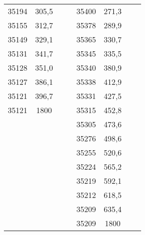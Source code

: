 \documentclass[11pt]{article}
\begin{document}
{{\begin{tabular}{|c|c|c|c|c|c|c|c|}
            \cline{1-2} \cline{5-6} 
            35194 & 305,5 & \multicolumn{1}{c}{} &  & 35400 & 271,3 &  & \tabularnewline
            \cline{1-2} \cline{5-6} 
            35155 & 312,7 & \multicolumn{1}{c}{} &  & 35378 & 289,9 &  & \tabularnewline
            \cline{1-2} \cline{5-6} 
            35149 & 329,1 & \multicolumn{1}{c}{} &  & 35365 & 330,7 &  & \tabularnewline
            \cline{1-2} \cline{5-6} 
            35131 & 341,7 & \multicolumn{1}{c}{} &  & 35345 & 335,5 &  & \tabularnewline
            \cline{1-2} \cline{5-6} 
            35128 & 351,0 & \multicolumn{1}{c}{} &  & 35340 & 380,9 &  & \tabularnewline
            \cline{1-2} \cline{5-6} 
            35127 & 386,1 & \multicolumn{1}{c}{} &  & 35338 & 412,9 &  & \tabularnewline
            \cline{1-2} \cline{5-6} 
            35121 & 396,7 & \multicolumn{1}{c}{} &  & 35331 & 427,5 &  & \tabularnewline
            \cline{1-2} \cline{5-6} 
            35121 & 1800 & \multicolumn{1}{c}{} &  & 35315 & 452,8 &  & \tabularnewline
            \cline{1-2} \cline{5-6} 
            \multicolumn{1}{c}{} & \multicolumn{1}{c}{} & \multicolumn{1}{c}{} &  & 35305 & 473,6 &  & \tabularnewline
            \cline{5-6} 
            \multicolumn{1}{c}{} & \multicolumn{1}{c}{} & \multicolumn{1}{c}{} &  & 35276 & 498,6 &  & \tabularnewline
            \cline{5-6} 
            \multicolumn{1}{c}{} & \multicolumn{1}{c}{} & \multicolumn{1}{c}{} &  & 35255 & 520,6 &  & \tabularnewline
            \cline{5-6} 
            \multicolumn{1}{c}{} & \multicolumn{1}{c}{} & \multicolumn{1}{c}{} &  & 35224 & 565,2 &  & \tabularnewline
            \cline{5-6} 
            \multicolumn{1}{c}{} & \multicolumn{1}{c}{} & \multicolumn{1}{c}{} &  & 35219 & 592,1 &  & \tabularnewline
            \cline{5-6} 
            \multicolumn{1}{c}{} & \multicolumn{1}{c}{} & \multicolumn{1}{c}{} &  & 35212 & 618,5 &  & \tabularnewline
            \cline{5-6} 
            \multicolumn{1}{c}{} & \multicolumn{1}{c}{} & \multicolumn{1}{c}{} &  & 35209 & 635,4 &  & \tabularnewline
            \cline{5-6} 
            \multicolumn{1}{c}{} & \multicolumn{1}{c}{} & \multicolumn{1}{c}{} &  & 35209 & 1800 &  & \tabularnewline
            \cline{5-6} 
        \end{tabular}
    }
}
\vspace*{\fill}
\end{document}
